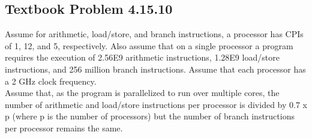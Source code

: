 \documentclass[12pt]{article}
\begin{document}
\subsection{Textbook Problem 4.15.10}
Assume for arithmetic, load/store, and branch instructions, a processor has CPIs of 1, 12, and 5, respectively. Also assume that on a single processor a program requires the execution of 2.56E9 arithmetic instructions, 1.28E9 load/store instructions, and 256 million branch instructions. Assume that each processor has a 2 GHz clock frequency.
\\
Assume that, as the program is parallelized to run over multiple cores, the number of arithmetic and load/store instructions per processor is divided by 0.7 x p (where p is the number of processors) but the number of branch instructions per processor remains the same.
\end{document}
